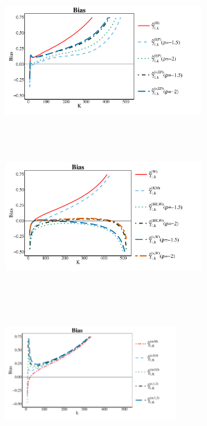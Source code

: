 \begin{landscape}
\begin{figure}[h]
	\centering
	\begin{subfigure}[h]{0.3\linewidth}
		\includegraphics[width=7.5cm,height=5.5cm]{./plots/paper2/Bias_simulations_B11_H.pdf}
	\end{subfigure}
	\hspace{\fill}
	\begin{subfigure}[h]{0.3\linewidth}
		\includegraphics[width=7.5cm,height=5.5cm]{./plots/paper2/Bias_simulations_B11_W.pdf}
	\end{subfigure}
	\hspace{\fill}
	\begin{subfigure}[h]{0.3\linewidth}
		\includegraphics[width=6.5cm,height=5.5cm]{./plots/paper2/Bias_simulations_B11_B.pdf}
	\end{subfigure}
	\hspace{\fill}
	\begin{subfigure}[h]{0.3\linewidth}

\end{subfigure}
\end{figure}
\end{landscape}
